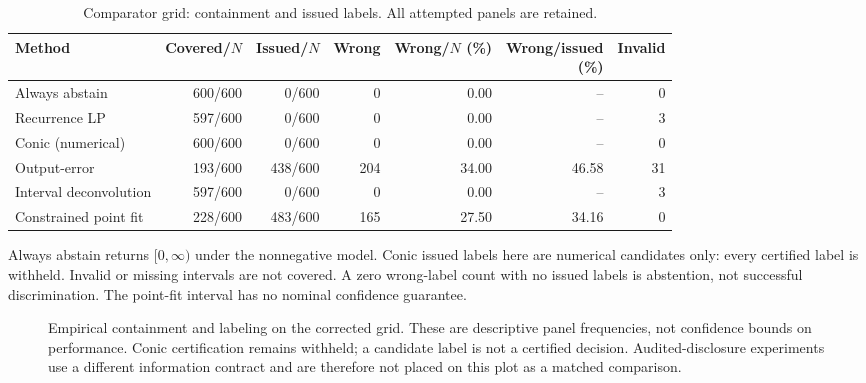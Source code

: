 \documentclass[10pt,twocolumn,letterpaper]{article}
\theoremstyle{definition}
\theoremstyle{remark}
\begin{document}
\begin{table}[htbp]\centering\small
\caption{Comparator grid: containment and issued labels. All attempted panels are retained.}
\label{tab:comparator_comparison}
\begin{tabular*}{\textwidth}{@{\extracolsep{\fill}}lrrrrrr@{}}
\toprule
Method & Covered/$N$ & Issued/$N$ & Wrong & \shortstack{Wrong/$N$\\(\%)} & \shortstack{Wrong/issued\\(\%)} & Invalid \\
\midrule
Always abstain & 600/600 & 0/600 & 0 & 0.00 & -- & 0 \\
Recurrence LP & 597/600 & 0/600 & 0 & 0.00 & -- & 3 \\
Conic (numerical) & 600/600 & 0/600 & 0 & 0.00 & -- & 0 \\
Output-error & 193/600 & 438/600 & 204 & 34.00 & 46.58 & 31 \\
Interval deconvolution & 597/600 & 0/600 & 0 & 0.00 & -- & 3 \\
Constrained point fit & 228/600 & 483/600 & 165 & 27.50 & 34.16 & 0 \\
\bottomrule\end{tabular*}
\par\smallskip\begin{minipage}{\textwidth}\footnotesize Always abstain returns $[0,\infty)$ under the nonnegative model. Conic issued labels here are numerical candidates only: every certified label is withheld. Invalid or missing intervals are not covered. A zero wrong-label count with no issued labels is abstention, not successful discrimination. The point-fit interval has no nominal confidence guarantee.\end{minipage}
\end{table}

\begin{figure}[htbp]\centering
{}
\caption{Empirical containment and labeling on the corrected grid. These are
descriptive panel frequencies, not confidence bounds on performance. Conic
certification remains withheld; a candidate label is not a certified decision.
Audited-disclosure experiments use a different information contract and are
therefore not placed on this plot as a matched comparison.}
\label{fig:comparator_frontier}\end{figure}
\end{document}
